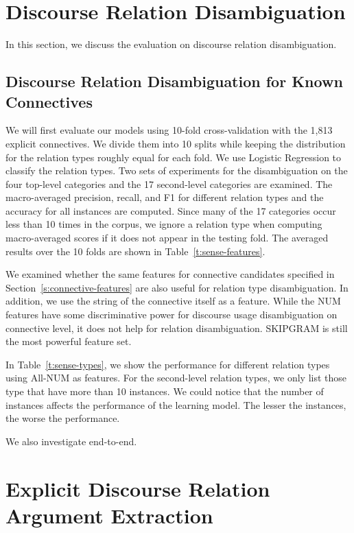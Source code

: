 \section{Discourse Relation Disambiguation}

In this section, we discuss the evaluation on discourse relation disambiguation.

\subsection{Discourse Relation Disambiguation for Known Connectives}

We will first evaluate our models using 10-fold cross-validation with the 1,813
explicit connectives. We divide them into 10 splits
while keeping the distribution for the relation types roughly equal for
each fold. We use Logistic Regression to classify the relation types.
Two sets of experiments for the disambiguation on the four top-level
categories and the 17 second-level categories are examined. The macro-averaged
precision, recall, and F1 for different relation types and the accuracy for
all instances are computed. Since many of the 17 categories occur less than
10 times in the corpus, we ignore a relation type when computing macro-averaged
scores if it does not appear in the testing fold. The averaged results over
the 10 folds are shown in Table~\ref{t:sense-features}.

We examined whether the same features
for connective candidates specified in Section~\ref{s:connective-features} are
also useful for relation type disambiguation. In addition, we use the string
of the connective itself as a feature. While the NUM features have some
discriminative power for discourse usage disambiguation on connective level,
it does not help for relation disambiguation. SKIPGRAM is still the most powerful
feature set.



In Table~\ref{t:sense-types}, we show the performance for different relation types
using All-NUM as features. For the second-level relation types, we only list
those type that have more than 10 instances. We could notice that the
number of instances affects the performance of the learning model. The
lesser the instances, the worse the performance.





We also investigate end-to-end.

\section{Explicit Discourse Relation Argument Extraction}
